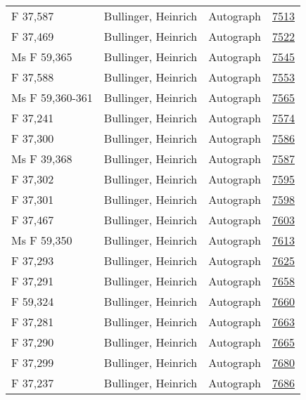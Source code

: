 \documentclass[10pt,a4paper,landscape]{report}
\begin{document}
\begin{longtable}{p{16cm}p{4cm}lr}
F 37,587	&	Bullinger, Heinrich	&	Autograph	&	\href{http://130.60.24.72/assignment/7513}{7513}\\
F 37,469	&	Bullinger, Heinrich	&	Autograph	&	\href{http://130.60.24.72/assignment/7522}{7522}\\
Ms F 59,365	&	Bullinger, Heinrich	&	Autograph	&	\href{http://130.60.24.72/assignment/7545}{7545}\\
F 37,588	&	Bullinger, Heinrich	&	Autograph	&	\href{http://130.60.24.72/assignment/7553}{7553}\\
Ms F 59,360-361	&	Bullinger, Heinrich	&	Autograph	&	\href{http://130.60.24.72/assignment/7565}{7565}\\
F 37,241	&	Bullinger, Heinrich	&	Autograph	&	\href{http://130.60.24.72/assignment/7574}{7574}\\
F 37,300	&	Bullinger, Heinrich	&	Autograph	&	\href{http://130.60.24.72/assignment/7586}{7586}\\
Ms F 39,368	&	Bullinger, Heinrich	&	Autograph	&	\href{http://130.60.24.72/assignment/7587}{7587}\\
F 37,302	&	Bullinger, Heinrich	&	Autograph	&	\href{http://130.60.24.72/assignment/7595}{7595}\\
F 37,301	&	Bullinger, Heinrich	&	Autograph	&	\href{http://130.60.24.72/assignment/7598}{7598}\\
F 37,467	&	Bullinger, Heinrich	&	Autograph	&	\href{http://130.60.24.72/assignment/7603}{7603}\\
Ms F 59,350	&	Bullinger, Heinrich	&	Autograph	&	\href{http://130.60.24.72/assignment/7613}{7613}\\
F 37,293	&	Bullinger, Heinrich	&	Autograph	&	\href{http://130.60.24.72/assignment/7625}{7625}\\
F 37,291	&	Bullinger, Heinrich	&	Autograph	&	\href{http://130.60.24.72/assignment/7658}{7658}\\
F 59,324	&	Bullinger, Heinrich	&	Autograph	&	\href{http://130.60.24.72/assignment/7660}{7660}\\
F 37,281	&	Bullinger, Heinrich	&	Autograph	&	\href{http://130.60.24.72/assignment/7663}{7663}\\
F 37,290	&	Bullinger, Heinrich	&	Autograph	&	\href{http://130.60.24.72/assignment/7665}{7665}\\
F 37,299	&	Bullinger, Heinrich	&	Autograph	&	\href{http://130.60.24.72/assignment/7680}{7680}\\
F 37,237	&	Bullinger, Heinrich	&	Autograph	&	\href{http://130.60.24.72/assignment/7686}{7686}\\

\end{longtable}
\end{document}
